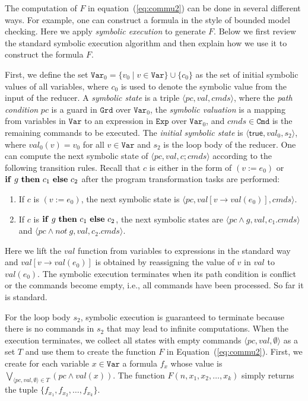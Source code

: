 \documentclass{llncs}
\newcommand{\Var}{\mathtt{Var}}
\newcommand{\Exp}{\mathtt{Exp}}
\newcommand{\Cmd}{\mathtt{Cmd}}
\newcommand{\Grd}{\mathtt{Grd}}
\newcommand{\true}{\mathsf{true}}
\newcommand{\ite}[3]{
	 \ifmmode 
	 \mathbf{if}\ #1 \ \mathbf{then}\ #2\  \mathbf{else}\ #3 
	 \else
	 \textbf{if}\ #1 \ \textbf{then}\ #2\  \textbf{else}\ #3
	 \fi}
\begin{document}
The computation of $F$ in equation~(\ref{eq:commu2}) can be done in several different ways. For example, one can construct a formula in the style of bounded model checking. Here we apply \emph{symbolic execution} to generate $F$. Below we first review the standard symbolic execution algorithm and then explain how we use it to construct the formula $F$.


First, we define the set $\Var_0=\{v_0 \mid v \in \Var \}\cup \{c_0\}$ as the set of initial symbolic values of all variables, where $c_0$ is used to denote the symbolic value from the input of the reducer.
A \emph{symbolic state} is a triple $\langle pc, val, cmds \rangle$, where the \emph{path condition} $pc$ is a guard in $\Grd$ over $\Var_0$, the \emph{symbolic valuation} is a mapping from variables in $\Var$ to an expression in $\Exp$ over $\Var_0$, and $cmds\in \Cmd$ is the remaining commands to be executed. The \emph{initial symbolic state} is $\langle \true, val_0, s_2\rangle$, where $val_0(v) = v_0$ for all $v\in\Var$ and $s_2$ is the loop body of the reducer. 
One can compute the next symbolic state of $\langle pc, val, c;cmds \rangle$ according to the following transition rules. Recall that $c$ is either in the form of $(v:= e_0)$ or $\ite{g}{c_1}{c_2}$ after the program transformation tasks are performed:
\begin{enumerate}
	\item If $c$ is $(v:= e_0)$, the next symbolic state is $\langle pc, val[v \rightarrow val(e_0) ], cmds \rangle$.
	\item If $c$ is $\ite{g}{c_1}{c_2}$, the next symbolic states are $\langle pc\wedge g, val, c_1.cmds \rangle$ and $\langle pc\wedge not\  g, val, c_2.cmds \rangle$. 
\end{enumerate}

Here we lift the $val$ function from variables to expressions in the standard way and $val[v \rightarrow val(e_0) ]$ is obtained by reassigning the value of $v$ in $val$ to $val(e_0)$. The symbolic execution terminates when its path condition is conflict or the commands become empty, i.e., all commands have been processed. So far it is standard. 

For the loop body $s_2$, symbolic execution is guaranteed to terminate because there is no commands in $s_2$ that may lead to infinite computations.
When the execution terminates, we collect all states with empty commands $\langle pc, val, \emptyset \rangle$ as a set $T$ and use them to create the function $F$ in Equation~(\ref{eq:commu2}). 
First, we create for each variable $x\in\Var$ a formula $f_x$ whose value is $\bigvee_{\langle pc, val, \emptyset \rangle \in T} (pc \wedge val(x))$.
The function $F(n,x_1,x_2,\ldots,x_k)$ simply returns the tuple $\{f_{x_1},f_{x_2},\ldots, f_{x_k}\}$.
 
\end{document}
